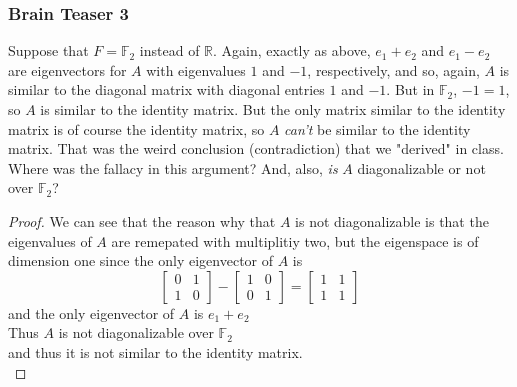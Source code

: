 \documentclass[answers,12pt,addpoints]{exam}
\begin{document}
\subsubsection{Brain Teaser 3}
Suppose that $F=\mathbb{F}_2$ instead of $\mathbb{R}$. Again, exactly
as above, $e_1+e_2$ and $e_1-e_2$ are eigenvectors for $A$ with eigenvalues
$1$ and $-1$, respectively, and so, again, $A$ is similar to the diagonal
matrix with diagonal entries $1$ and $-1$. But in $\mathbb{F}_2$, $-1=1$, so $A$ is
similar to the identity matrix. But the only matrix similar to the
identity matrix is of course the identity matrix, so $A$ \emph{can't} be
similar to the identity matrix. That was the weird conclusion
(contradiction) that we "derived" in class. Where was the fallacy in
this argument? And, also, \emph{is} $A$ diagonalizable or not over $\mathbb{F}_2$?
\begin{proof}
    We can see that the reason why that $A$ is not diagonalizable is that the eigenvalues of $A$ are remepated with multiplitiy two, but the eigenspace is of dimension one since the only eigenvector of $A$ is 
    $$ \begin{bmatrix}
        0 & 1\\
        1 & 0
    \end{bmatrix} - \begin{bmatrix}
        1 & 0\\
        0 & 1
    \end{bmatrix} = \begin{bmatrix}
        1 & 1\\
        1 & 1
    \end{bmatrix}$$
    and the only eigenvector of $A$ is $e_1 + e_2$\\
    Thus $A$ is not diagonalizable over $\mathbb{F}_2$\\
    and thus it is not similar to the identity matrix.\\

\end{proof}
\end{document}
